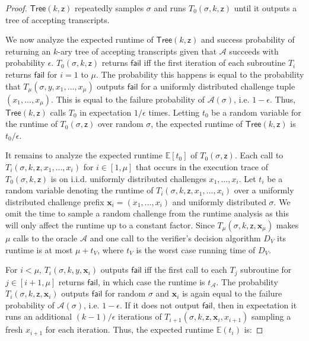 \begin{proof}
$\textsf{Tree}(k, \mathsf{z})$ repeatedly samples $\sigma$ and runs $T_0(\sigma, k,\mathsf{z})$ until it outputs a tree of accepting transcripts.

We now analyze the expected runtime of $\mathsf{Tree}(k, \mathsf{z})$ and success probability of returning an $k$-ary tree of accepting transcripts given that $\mathcal{A}$ succeeds with probability $\epsilon$. $T_0(\sigma,k, \mathsf{z})$ returns $\mathsf{fail}$ iff the first iteration of each subroutine $T_i$ returns $\mathsf{fail}$ for $i = 1$ to $\mu$. The probability this happens is equal to the probability that $T_\mu(\sigma, y, x_1,...,x_\mu)$ outputs $\mathsf{fail}$ for a uniformly distributed challenge tuple $(x_1,...,x_\mu)$. This is equal to the failure probability of $\mathcal{A}(\sigma)$, i.e. $1 - \epsilon$. Thus, $\mathsf{Tree}(k, \mathsf{z})$ calls $T_0$ in expectation $1/\epsilon$ times. Letting $t_0$ be a random variable for the runtime of $T_0(\sigma, \mathsf{z})$ over random $\sigma$, the expected runtime of $\mathsf{Tree}(k, \mathsf{z})$ is $t_0/\epsilon$. 


It remains to analyze the expected runtime $\mathbb{E}[t_0]$ of $T_0(\sigma, \mathsf{z})$. Each call to $T_i(\sigma, k, \mathsf{z}, x_1,...,x_i)$ for $i \in [1,\mu]$ that occurs in the execution trace of $T_0(\sigma, k, \mathsf{z})$ is on i.i.d. uniformly distributed challenges $x_1,...,x_i$. Let $t_i$ be a random variable denoting the runtime of $T_i(\sigma, k, \mathsf{z}, x_1,...,x_i)$ over a uniformly distributed challenge prefix $\mathbf{x}_i = (x_1,...,x_i)$ and uniformly distributed $\sigma$. We omit the time to sample a random challenge from the runtime analysis as this will only affect the runtime up to a constant factor. Since $T_\mu(\sigma, k, \mathsf{z}, \mathbf{x}_\mu)$ makes $\mu$ calls to the oracle $\mathcal{A}$ and one call to the verifier's decision algorithm $D_V$ its runtime is at most $\mu + t_V$, where $t_V$ is the worst case running time of $D_V$.  

For $i < \mu$, $T_i(\sigma, k,y, \mathbf{x}_i)$ outputs $\mathsf{fail}$ iff the first call to each $T_{j}$ subroutine for $j \in [i+1,\mu]$ returns $\mathsf{fail}$, in which case the runtime is $t_\mathcal{A}$. The probability $T_i(\sigma, k, \mathsf{z}, \mathbf{x}_i)$ outputs $\mathsf{fail}$ for random $\sigma$ and $\mathbf{x}_i$ is again equal to the failure probability of $\mathcal{A}(\sigma)$, i.e. $1 - \epsilon$. If it does not output $\mathsf{fail}$, then in expectation it runs an additional $(k-1)/\epsilon$ iterations of $T_{i+1}(\sigma, k, \mathsf{z}, \mathbf{x}_i, x_{i+1})$ sampling a fresh $x_{i+1}$ for each iteration. Thus, the expected runtime $\mathbb{E}(t_i)$ is: 


\end{proof}
